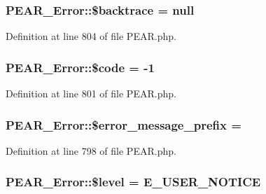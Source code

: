 \subsubsection[{\$backtrace}]{\setlength{\rightskip}{0pt plus 5cm}P\+E\+A\+R\+\_\+\+Error\+::\$backtrace = null}\label{classPEAR__Error_a8b3d92f4ec98d4af469e38a8f1030ff4}


Definition at line 804 of file P\+E\+A\+R.\+php.

\hypertarget{classPEAR__Error_ae7c2938ab048474acaa2755a0161da3e}{}
\subsubsection[{\$code}]{\setlength{\rightskip}{0pt plus 5cm}P\+E\+A\+R\+\_\+\+Error\+::\$code = -\/1}\label{classPEAR__Error_ae7c2938ab048474acaa2755a0161da3e}


Definition at line 801 of file P\+E\+A\+R.\+php.

\hypertarget{classPEAR__Error_aea8e8d491c90daabbc7de7ef8d9eef2d}{}
\subsubsection[{\$error\+\_\+message\+\_\+prefix}]{\setlength{\rightskip}{0pt plus 5cm}P\+E\+A\+R\+\_\+\+Error\+::\$error\+\_\+message\+\_\+prefix = \textquotesingle{}\textquotesingle{}}\label{classPEAR__Error_aea8e8d491c90daabbc7de7ef8d9eef2d}


Definition at line 798 of file P\+E\+A\+R.\+php.

\hypertarget{classPEAR__Error_a3fad062a32df55f9bd17af007e16cd49}{}
\subsubsection[{\$level}]{\setlength{\rightskip}{0pt plus 5cm}P\+E\+A\+R\+\_\+\+Error\+::\$level = E\+\_\+\+U\+S\+E\+R\+\_\+\+N\+O\+T\+I\+C\+E}\label{classPEAR__Error_a3fad062a32df55f9bd17af007e16cd49}


